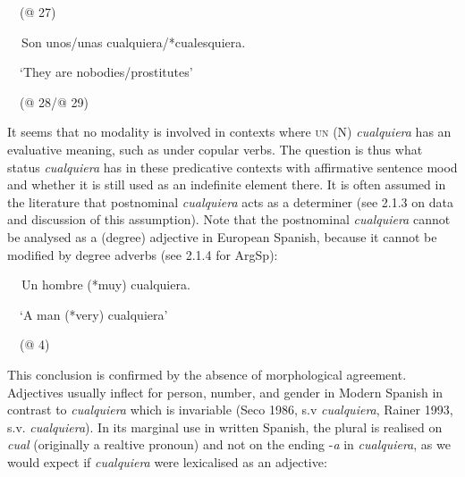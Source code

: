 \begin{styleStandard}
\ \ (@ 27)
\end{styleStandard}

\begin{styleStandard}
\label{bkm:Ref533761216}\textbf{\ \ }Son unos/unas cualquiera/*cualesquiera.
\end{styleStandard}

\begin{styleStandard}
\ \ ‘They are nobodies/prostitutes’
\end{styleStandard}

\begin{styleStandard}
\ \ (@ 28/@ 29)
\end{styleStandard}

\begin{styleStandard}
It seems that no modality is involved in contexts where \textsc{un} (N) \textit{cualquiera} has an evaluative meaning, such as under copular verbs. The question is thus what status \textit{cualquiera} has in these predicative contexts with affirmative sentence mood and whether it is still used as an indefinite element there. It is often assumed in the literature that postnominal \textit{cualquiera} acts as a determiner (see 2.1.3 on data and discussion of this assumption). Note that the postnominal \textit{cualquiera} cannot be analysed as a (degree) adjective in European Spanish, because it cannot be modified by degree adverbs (see 2.1.4 for ArgSp):
\end{styleStandard}

\begin{styleStandard}
\textbf{\ \ }Un hombre (*muy) cualquiera.
\end{styleStandard}

\begin{styleStandard}
\ \ ‘A man (*very) cualquiera’
\end{styleStandard}

\begin{styleStandard}
\ \ (@ 4)
\end{styleStandard}

\begin{styleStandard}
This conclusion is confirmed by the absence of morphological agreement. Adjectives usually inflect for person, number, and gender in Modern Spanish in contrast to \textit{cualquiera} which is invariable (Seco 1986, s.v \textit{cualquiera}, Rainer 1993, s.v. \textit{cualquiera}). In its marginal use in written Spanish, the plural is realised on \textit{cual} (originally a realtive pronoun) and not on the ending -\textit{a} in \textit{cualquiera}, as we would expect if \textit{cualquiera} were lexicalised as an adjective:
\end{styleStandard}

